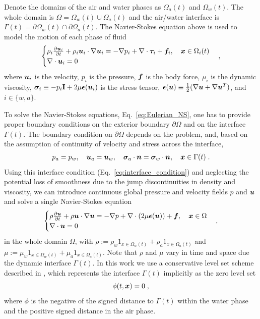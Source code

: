 Denote the domains of the air and water phases as 
$\Omega_a(t)$ and $\Omega_w(t)$. The whole domain is $\Omega = \Omega_w(t)\cup\Omega_a(t)$ and the air/water interface is $\Gamma(t) = \overline{\partial\Omega_w(t)}\cap \overline{\partial\Omega_a(t)}$. 
The Navier-Stokes equation above is used to model the motion of each phase of fluid
\begin{align}
\begin{cases}
\rho_i\frac{\partial \boldsymbol{u}_i}{\partial t} + \rho_i \boldsymbol{u}_i\cdot\nabla\boldsymbol{u}_i = -\nabla p_i + \nabla\cdot \bm{\tau}_i+\boldsymbol{f}_i,\quad \boldsymbol{x}\in\Omega_i(t)\\
\nabla\cdot\boldsymbol{u}_i = 0 \; 
\end{cases},\label{eq:Eulerian_NS}
\end{align}
where $\boldsymbol{u}_i$ is the velocity, $p_i$ is the pressure, $\boldsymbol{f}$ is the body force, 
$\mu_i$ is the dynamic viscosity, $\bm{\sigma}_i \equiv -p_i\mathbf{I}+ 2\mu\bm{\epsilon}(\boldsymbol{u}_i)$ is the stress tensor, 
$\bm{\epsilon}(\boldsymbol{u})\equiv \frac{1}{2}(\nabla\boldsymbol{u}+\nabla\boldsymbol{u}^T)$, 
and $i\in \{w,a\}$. 

To solve the Navier-Stokes equations, Eq.~\ref{eq:Eulerian_NS}, 
one has to provide proper boundary conditions on the exterior boundary $\partial\Omega$ and on the interface 
$\Gamma(t)$. The boundary condition on $\partial\Omega$
depends on the problem, and, based on the assumption of continuity of velocity and stress across the interface, 
\begin{align}
\label{eq:interface_condition}
p_a = p_w, \quad \boldsymbol{u}_a = \boldsymbol{u}_w, \quad {\boldsymbol{\sigma}}_a \cdot \boldsymbol{n} = {\boldsymbol{\sigma}}_w \cdot \boldsymbol{n},\quad \boldsymbol{x}\in\Gamma(t) \; .
\end{align}
Using this interface condition (Eq.~\ref{eq:interface_condition}) and neglecting the potential loss of smoothness due to the jump discontinuities in density and viscosity, we can introduce continuous global pressure and velocity fields $p$ and $\boldsymbol{u}$ and solve a single Navier-Stokes equation
\begin{align*}
\begin{cases}
\rho\frac{\partial \boldsymbol{u}}{\partial t} + \rho\boldsymbol{u}\cdot\nabla\boldsymbol{u} = -\nabla p + \nabla\cdot (2\mu\bm{\epsilon}(\bm u))+\boldsymbol{f},\quad \boldsymbol{x}\in\Omega\\
\nabla\cdot\boldsymbol{u} = 0 
\end{cases},
\end{align*}
in the whole domain $\Omega$, with $\rho := \rho_w 1_{x\in\Omega_w(t)}+\rho_a 1_{x\in\Omega_a(t)}$ and 
$\mu := \mu_w 1_{x\in\Omega_w(t)}+\mu_a 1_{x\in\Omega_a(t)}$. Note that $\rho$ and $\mu$ vary in time and space due the dynamic interface $\Gamma(t)$. In this work we use a conservative level set scheme described in \cite{KAFB11}, which represents the interface $\Gamma(t)$ implicitly as the zero level set
\begin{equation}
\phi(t,\boldsymbol{x}) = 0 \; ,
\end{equation}
where $\phi$ is the negative of the signed distance to $\Gamma(t)$ within the water phase and the positive signed distance in the air phase.

